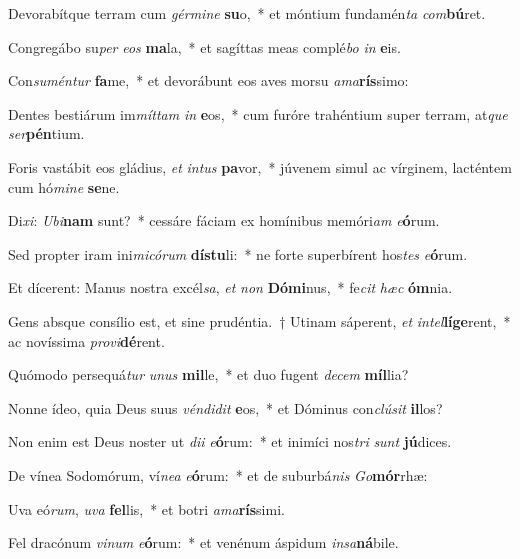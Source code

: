 \item Devorabítque terram cum \textit{gér}\textit{mi}\textit{ne} \textbf{su}o,~* et móntium fundamén\textit{ta} \textit{com}\textbf{bú}ret.
\item Congregábo su\textit{per} \textit{e}\textit{os} \textbf{ma}la,~* et sagíttas meas complé\textit{bo} \textit{in} \textbf{e}is.
\item Con\textit{su}\textit{mén}\textit{tur} \textbf{fa}me,~* et devorábunt eos aves morsu \textit{a}\textit{ma}\textbf{rís}simo:
\item Dentes bestiárum im\textit{mít}\textit{tam} \textit{in} \textbf{e}os,~* cum furóre trahéntium super terram, at\textit{que} \textit{ser}\textbf{pén}tium.
\item Foris vastábit eos gládius, \textit{et} \textit{in}\textit{tus} \textbf{pa}vor,~* júvenem simul ac vírginem, lacténtem cum hó\textit{mi}\textit{ne} \textbf{se}ne.
\item Di\textit{xi}: \textit{U}\textit{bi}\textbf{nam} sunt?~* cessáre fáciam ex homínibus memóri\textit{am} \textit{e}\textbf{ó}rum.
\item Sed propter iram ini\textit{mi}\textit{có}\textit{rum} \textbf{dís}\textbf{tu}li:~* ne forte superbírent hos\textit{tes} \textit{e}\textbf{ó}rum.
\item Et dícerent: Manus nostra excél\textit{sa}, \textit{et} \textit{non} \textbf{Dó}\textbf{mi}nus,~* fe\textit{cit} \textit{hæc} \textbf{óm}nia.
\item Gens absque consílio est, et sine prudéntia.~† Utinam sáperent, \textit{et} \textit{in}\textit{tel}\textbf{lí}\textbf{ge}rent,~* ac novíssima \textit{pro}\textit{vi}\textbf{dé}rent.
\item Quómodo persequá\textit{tur} \textit{u}\textit{nus} \textbf{mil}le,~* et duo fugent \textit{de}\textit{cem} \textbf{míl}lia?
\item Nonne ídeo, quia Deus suus \textit{vén}\textit{di}\textit{dit} \textbf{e}os,~* et Dóminus con\textit{clú}\textit{sit} \textbf{il}los?
\item Non enim est Deus noster ut \textit{di}\textit{i} \textit{e}\textbf{ó}rum:~* et inimíci nos\textit{tri} \textit{sunt} \textbf{jú}dices.
\item De vínea Sodomórum, ví\textit{ne}\textit{a} \textit{e}\textbf{ó}rum:~* et de suburbá\textit{nis} \textit{Go}\textbf{mór}rhæ:
\item Uva eó\textit{rum}, \textit{u}\textit{va} \textbf{fel}lis,~* et botri \textit{a}\textit{ma}\textbf{rís}simi.
\item Fel dracónum \textit{vi}\textit{num} \textit{e}\textbf{ó}rum:~* et venénum áspidum \textit{in}\textit{sa}\textbf{ná}bile.
